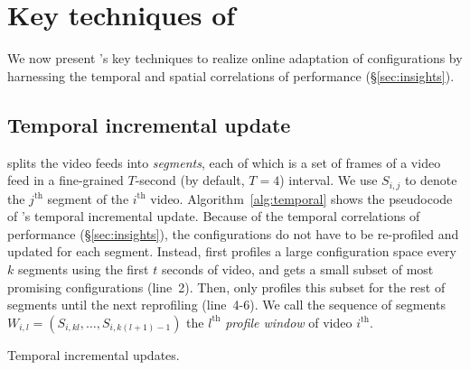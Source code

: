 \section{Key techniques of \name}
\label{sec:algorithm}
We now present \name's key techniques to realize online 
adaptation of \nn configurations by harnessing the temporal
and spatial correlations of \nn performance (\S\ref{sec:insights}).

\subsection{Temporal incremental update}
\name splits the video feeds into {\em segments}, each 
of which is a set of frames of a video feed in a fine-grained 
$T$-second (by default, $T=4$) interval. 
We use $S_{i,j}$ to denote the $j^\textrm{th}$ segment of the
$i^\textrm{th}$ video.
Algorithm~\ref{alg:temporal} shows the pseudocode of \name's
temporal incremental update. 
Because of the temporal correlations of \nn performance 
(\S\ref{sec:insights}), the \nn configurations do 
not have to be re-profiled and updated for each segment.
Instead, \name first profiles a large configuration space 
every $k$ segments using the first $t$ seconds of video, and 
gets a small subset of most promising configurations (line~2).
Then, \name only profiles this subset for the rest of segments
until the next reprofiling (line~4-6).
We call the sequence of segments 
$W_{i,l}=(S_{i,kl},\dots,S_{i,k(l+1)-1})$
the $l^\textrm{th}$ {\em profile window} of 
video $i^\textrm{th}$.

\begin{algorithm}[t!]
    \small
	\DontPrintSemicolon
	\caption{Temporal incremental updates.}
	\label{alg:temporal}
\end{algorithm}


